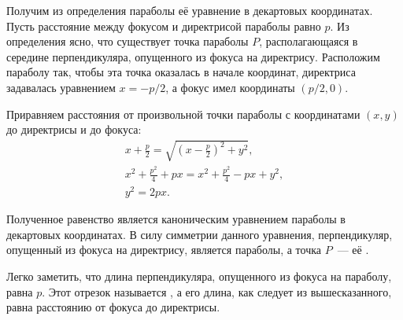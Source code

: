 Получим из определения параболы её уравнение в декартовых координатах. Пусть расстояние между фокусом и директрисой параболы равно $p$. Из определения ясно, что существует точка параболы $P$, располагающаяся в середине перпендикуляра, опущенного из фокуса на директрису. Расположим параболу так, чтобы эта точка оказалась в начале координат, директриса задавалась уравнением $x = -p/2$, а фокус имел координаты $(p/2, 0)$.

Приравняем расстояния от произвольной точки параболы с координатами $(x, y)$ до директрисы и до фокуса:
\begin{gather*}
	x + \frac{p}{2} = \sqrt{\left(x - \frac{p}{2} \right)^2 + y^2},\\
	x^2 + \frac{p^2}{4} + px = x^2 + \frac{p^2}{4} - px + y^2,\\
	y^2 = 2px. \tag{\theequation}
\end{gather*}

Полученное равенство является каноническим уравнением параболы в декартовых координатах. В силу симметрии данного уравнения, перпендикуляр, опущенный из фокуса на директрису, является  параболы, а точка $P$~--- её .

Легко заметить, что длина перпендикуляра, опущенного из фокуса на параболу, равна $p$. Этот отрезок называется , а его длина, как следует из вышесказанного, равна расстоянию от фокуса до директрисы.


